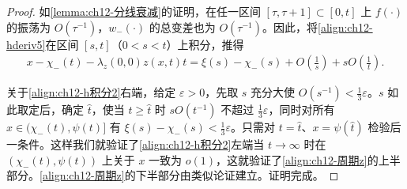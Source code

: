 \documentclass[../../main.tex]{subfiles}
\begin{document}
\begin{proof}
如\cref{lemma:ch12-分线衰减}的证明，在任一区间 $[\tau,\tau+1]\subset[0,t]$ 上 $f(\cdot)$ 的振荡为 $O(\tau^{-1})$，$w_-(\cdot)$ 的总变差也为 $O(\tau^{-1})$。因此，将\eqref{align:ch12-hderiv5}在区间 $[s,t]$（$0<s<t$）上积分，推得
\begin{align}
x-\chi_-(t)-\lambda_z(0,0)z(x,t)t=\xi(s)-\chi_-(s)+O\left(\frac1s\right)+sO\left(\frac1t\right).
\label{align:ch12-h积分2}
\end{align}

关于\eqref{align:ch12-h积分2}右端，给定 $\varepsilon>0$，先取 $s$ 充分大使 $O(s^{-1})<\frac13\varepsilon$。$s$ 如此取定后，确定 $\hat t$，使当 $t\geqslant\hat t$ 时 $sO(t^{-1})$ 不超过 $\frac13\varepsilon$，同时对所有 $x\in(\chi_-(t),\psi(t)]$ 有 $\xi(s)-\chi_-(s)<\frac13\varepsilon$。只需对 $t=\hat t$、$x=\psi(\hat t)$ 检验后一条件。这样我们就验证了\eqref{align:ch12-h积分2}左端当 $t\to\infty$ 时在 $(\chi_-(t),\psi(t))$ 上关于 $x$ 一致为 $o(1)$，这就验证了\eqref{align:ch12-周期z}的上半部分。\eqref{align:ch12-周期z}的下半部分由类似论证建立。证明完成。
\end{proof}
\end{document}
